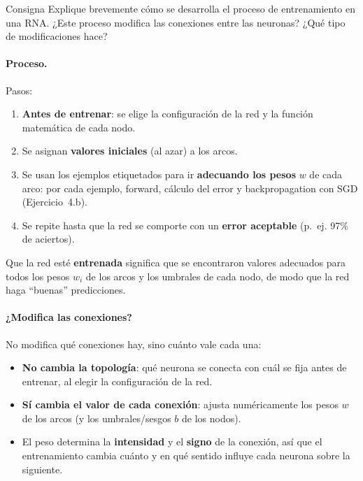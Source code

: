 \documentclass[11pt,a4paper]{article}
\begin{document}
\begin{enunciado}{Consigna}
Explique brevemente cómo se desarrolla el proceso de entrenamiento en una RNA. ¿Este proceso modifica las conexiones entre las neuronas? ¿Qué tipo de modificaciones hace?
\end{enunciado}

\paragraph{Proceso.} Pasos:
\begin{enumerate}
  \item \textbf{Antes de entrenar}: se elige la configuración de la red y la función matemática de cada nodo.
  \item Se asignan \textbf{valores iniciales} (al azar) a los arcos.
  \item Se usan los ejemplos etiquetados para ir \textbf{adecuando los pesos} $w$ de cada arco: por cada ejemplo, forward, cálculo del error y backpropagation con SGD (Ejercicio~4.b).
  \item Se repite hasta que la red se comporte con un \textbf{error aceptable} (p.~ej. 97\% de aciertos).
\end{enumerate}
Que la red esté \textbf{entrenada} significa que se encontraron valores adecuados para todos los pesos $w_i$ de los arcos y los umbrales de cada nodo, de modo que la red haga ``buenas'' predicciones.

\paragraph{¿Modifica las conexiones?} No modifica qué conexiones hay, sino cuánto vale cada una:
\begin{itemize}
  \item \textbf{No cambia la topología}: qué neurona se conecta con cuál se fija antes de entrenar, al elegir la configuración de la red.
  \item \textbf{Sí cambia el valor de cada conexión}: ajusta numéricamente los pesos $w$ de los arcos (y los umbrales/sesgos $b$ de los nodos).
  \item El peso determina la \textbf{intensidad} y el \textbf{signo} de la conexión, así que el entrenamiento cambia cuánto y en qué sentido influye cada neurona sobre la siguiente.
\end{itemize}
\end{document}

